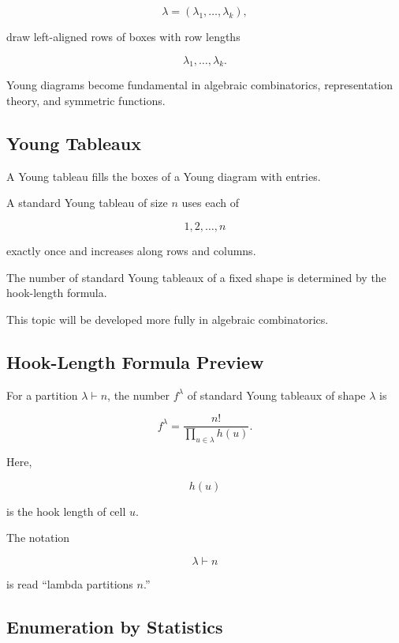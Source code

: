 \[
\lambda
=
(\lambda_1,\ldots,\lambda_k),
\]

draw left-aligned rows of boxes with row lengths

\[
\lambda_1,\ldots,\lambda_k.
\]

Young diagrams become fundamental in algebraic combinatorics,
representation theory, and symmetric functions.

\subsection{Young Tableaux}
\label{subsec:young-tableaux-preview}

A Young tableau fills the boxes of a Young diagram with entries.

A standard Young tableau of size \(n\) uses each of

\[
1,2,\ldots,n
\]

exactly once and increases along rows and columns.

The number of standard Young tableaux of a fixed shape is determined by
the hook-length formula.

This topic will be developed more fully in algebraic combinatorics.

\subsection{Hook-Length Formula Preview}
\label{subsec:hook-length-preview}

For a partition \(\lambda\vdash n\), the number \(f^\lambda\) of
standard Young tableaux of shape \(\lambda\) is

\[
\boxed{
f^\lambda
=
\frac{n!}{
\prod_{u\in\lambda}h(u)
}.
}
\]

Here,

\[
h(u)
\]

is the hook length of cell \(u\).

The notation

\[
\lambda\vdash n
\]

is read ``lambda partitions \(n\).''

\subsection{Enumeration by Statistics}
\label{subsec:enumeration-by-statistics}

